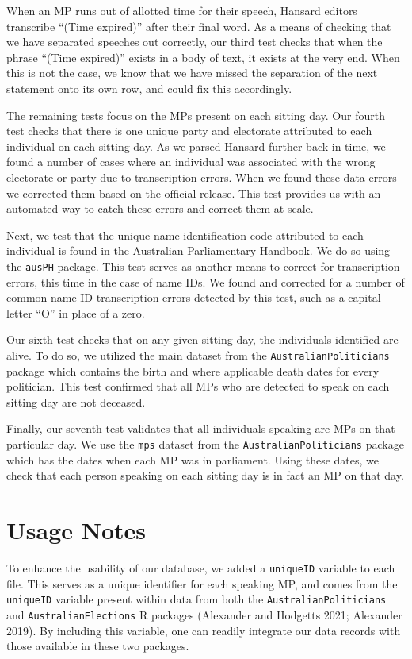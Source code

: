 \documentclass[
  letterpaper,
  DIV=11,
  numbers=noendperiod]{scrartcl}
\begin{document}
When an MP runs out of allotted time for their speech, Hansard editors
transcribe ``(Time expired)'' after their final word. As a means of
checking that we have separated speeches out correctly, our third test
checks that when the phrase ``(Time expired)'' exists in a body of text,
it exists at the very end. When this is not the case, we know that we
have missed the separation of the next statement onto its own row, and
could fix this accordingly.

The remaining tests focus on the MPs present on each sitting day. Our
fourth test checks that there is one unique party and electorate
attributed to each individual on each sitting day. As we parsed Hansard
further back in time, we found a number of cases where an individual was
associated with the wrong electorate or party due to transcription
errors. When we found these data errors we corrected them based on the
official release. This test provides us with an automated way to catch
these errors and correct them at scale.

Next, we test that the unique name identification code attributed to
each individual is found in the Australian Parliamentary Handbook. We do
so using the \texttt{ausPH} package. This test serves as another means
to correct for transcription errors, this time in the case of name IDs.
We found and corrected for a number of common name ID transcription
errors detected by this test, such as a capital letter ``O'' in place of
a zero.

Our sixth test checks that on any given sitting day, the individuals
identified are alive. To do so, we utilized the main dataset from the
\texttt{AustralianPoliticians} package which contains the birth and
where applicable death dates for every politician. This test confirmed
that all MPs who are detected to speak on each sitting day are not
deceased.

Finally, our seventh test validates that all individuals speaking are
MPs on that particular day. We use the \texttt{mps} dataset from the
\texttt{AustralianPoliticians} package which has the dates when each MP
was in parliament. Using these dates, we check that each person speaking
on each sitting day is in fact an MP on that day.

\hypertarget{sec-usage}{%
\section{Usage Notes}\label{sec-usage}}

To enhance the usability of our database, we added a \texttt{uniqueID}
variable to each file. This serves as a unique identifier for each
speaking MP, and comes from the \texttt{uniqueID} variable present
within data from both the \texttt{AustralianPoliticians} and
\texttt{AustralianElections} R packages (Alexander and Hodgetts 2021;
Alexander 2019). By including this variable, one can readily integrate
our data records with those available in these two packages.
\end{document}
